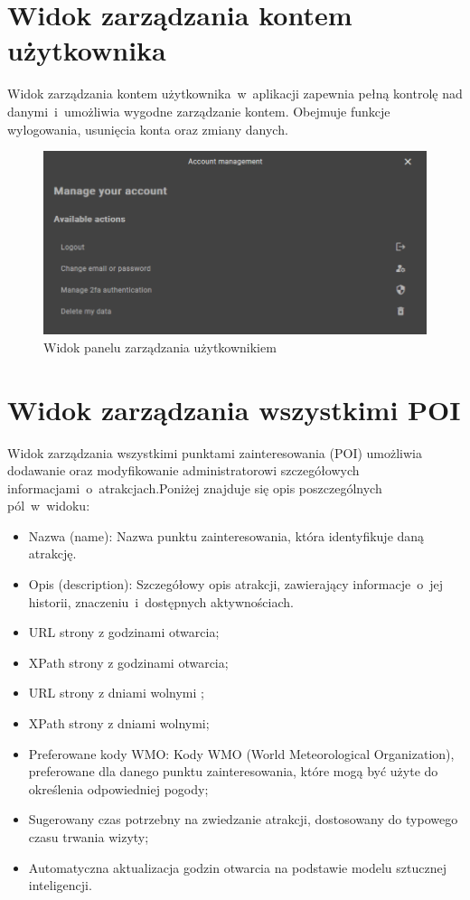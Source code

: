 \section{Widok zarządzania kontem użytkownika}
\label{sec:user}
Widok zarządzania kontem użytkownika~w~aplikacji zapewnia pełną kontrolę
nad danymi~i~umożliwia wygodne zarządzanie kontem. Obejmuje funkcje wylogowania, usunięcia konta oraz zmiany danych.
\begin{figure}[H]
    \centering
    \includegraphics[width=1\textwidth]{attachments/user}
    \caption{Widok panelu zarządzania użytkownikiem}
    \label{fig:user}
\end{figure}

\section{Widok zarządzania wszystkimi POI}
\label{sec:manage}
Widok zarządzania wszystkimi punktami zainteresowania (POI) umożliwia dodawanie oraz modyfikowanie administratorowi
szczegółowych informacjami~o~atrakcjach.\newline Poniżej znajduje się opis poszczególnych pól~w~widoku:
\begin{itemize}
    \item Nazwa (name): Nazwa punktu zainteresowania, która identyfikuje daną atrakcję.
    \item Opis (description): Szczegółowy opis atrakcji, zawierający informacje~o~jej historii, znaczeniu~i~dostępnych aktywnościach.
    \item URL strony z godzinami otwarcia;
    \item XPath strony z godzinami otwarcia;
    \item URL strony z dniami wolnymi ;
    \item XPath strony z dniami wolnymi;
    \item  Preferowane kody WMO: Kody WMO (World Meteorological Organization), preferowane dla danego punktu zainteresowania, które mogą być użyte do określenia odpowiedniej pogody;
    \item  Sugerowany czas potrzebny na zwiedzanie atrakcji, dostosowany do typowego czasu trwania wizyty;
    \item Automatyczna aktualizacja godzin otwarcia na podstawie modelu sztucznej inteligencji.
\end{itemize}

